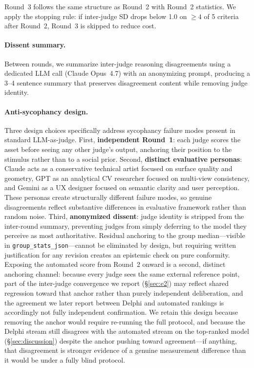 \documentclass[10pt]{article}
\begin{document}
Round~3 follows the same structure as Round~2 with Round~2 statistics.
We apply the \citet{delphi_convergence} stopping rule: if inter-judge SD
drops below 1.0 on $\geq 4$ of 5 criteria after Round~2, Round~3 is skipped
to reduce cost.

\paragraph{Dissent summary.}
Between rounds, we summarize inter-judge reasoning disagreements using a
dedicated LLM call (Claude Opus~4.7) with an anonymizing prompt, producing a
3--4 sentence summary that preserves disagreement content while removing
judge identity.

\paragraph{Anti-sycophancy design.}
Three design choices specifically address sycophancy failure modes present in
standard LLM-as-judge.
First, \textbf{independent Round~1}: each judge scores the asset before seeing
any other judge's output, anchoring their position to the stimulus rather than
to a social prior.
Second, \textbf{distinct evaluative personas}: Claude acts as a conservative
technical artist focused on surface quality and geometry, GPT as an analytical
CV researcher focused on multi-view consistency, and Gemini as a UX designer
focused on semantic clarity and user perception.
These personas create structurally different failure modes, so genuine
disagreements reflect substantive differences in evaluative framework rather
than random noise.
Third, \textbf{anonymized dissent}: judge identity is stripped from the
inter-round summary, preventing judges from simply deferring to the model they
perceive as most authoritative.
Residual anchoring to the group median---visible in \texttt{group\_stats\_json}---cannot be eliminated by design, but requiring written justification for any revision creates an epistemic check on pure conformity.
Exposing the automated score from Round~2 onward is a second, distinct
anchoring channel: because every judge sees the same external reference
point, part of the inter-judge convergence we report (\S\ref{sec:e2}) may
reflect shared regression toward that anchor rather than purely
independent deliberation, and the agreement we later report between
Delphi and automated rankings is accordingly not fully independent
confirmation. We retain this design because removing the anchor would
require re-running the full protocol, and because the Delphi stream still
disagrees with the automated stream on the top-ranked model
(\S\ref{sec:discussion}) despite the anchor pushing toward agreement---if
anything, that disagreement is stronger evidence of a genuine measurement
difference than it would be under a fully blind protocol.
\end{document}
